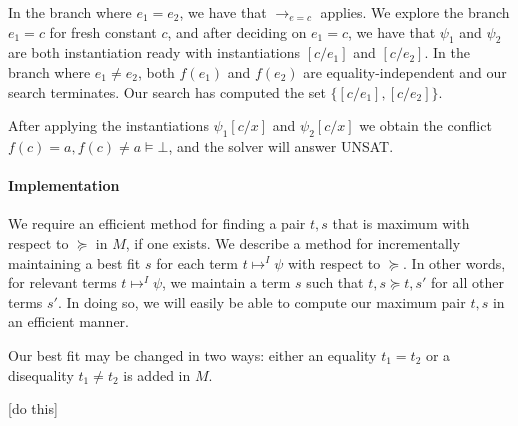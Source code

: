 \documentclass{llncs}
\begin{document}
In the branch where $e_1 = e_2$, we have that $\rightarrow_{e=c}$ applies.
We explore the branch $e_1 = c$ for fresh constant $c$, and after deciding on $e_1 = c$, we have that $\psi_1$ and $\psi_2$ are both instantiation ready with instantiations $[c/e_1]$ and $[c/e_2]$.
In the branch where $e_1 \neq e_2$, both $f( e_1 )$ and $f( e_2 )$ are equality-independent and our search terminates.
Our search has computed the set $\{ [c/e_1], [c/e_2] \}$.

After applying the instantiations $\psi_1[c/x]$ and $\psi_2[c/x]$ we obtain the conflict $f( c ) = a, f( c ) \neq a \models \bot$, and the solver will answer UNSAT. \\




\paragraph{Implementation}

We require an efficient method for finding a pair $t, s$ that is maximum with respect to $\succeq$ in $M$, if one exists.
We describe a method for incrementally maintaining a best fit $s$ for each term $t \mapsto^I \psi$ with respect to $\succeq$.
In other words, for relevant terms $t \mapsto^I \psi$, we maintain a term $s$ such that $t,s \succeq t,s'$ for all other terms $s'$.
In doing so, we will easily be able to compute our maximum pair $t,s$ in an efficient manner.

Our best fit may be changed in two ways: either an equality $t_1 = t_2$ or a disequality $t_1 \neq t_2$ is added in $M$.

[do this] \\
\end{document}

